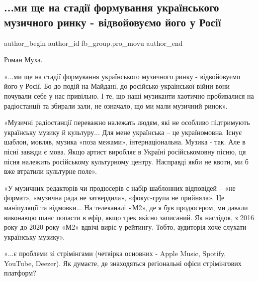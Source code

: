  
 
 
 
 
 
\subsection{...ми ще на стадії формування українського музичного ринку - відвойовуємо його у Росії}
\label{sec:18_06_2021.fb.fb_group.pro_movu.1.muzyka_rynok_rossia}
\ifcmt
 author_begin
   author_id fb_group.pro_movu
 author_end
\fi

Роман Муха.

«...ми ще на стадії формування українського музичного ринку - відвойовуємо його
у Росії. Бо до подій на Майдані, до російсько-української війни вони почували
себе у нас привільно. І те, що наші музиканти хаотично пробивалися на
радіостанції та збирали зали, не означало, що ми мали музичний ринок». 

«Музичні радіостанції переважно належать людям, які не особливо підтримують
українську музику й культуру... Для мене українська – це україномовна. Існує
шаблон, мовляв, музика «поза межами», інтернаціональна. Музика - так. Але в
пісні завжди є мова. Якщо артист виробляє в Україні російськомовну пісню, ця
пісня належить російському культурному центру. Насправді якби не квоти, ми б
вже втратили культурне поле».

«У  музичних редакторів чи продюсерів є набір шаблонних відповідей – «не
формат», «музична рада не затвердила», «фокус-група не прийняла». Це
маніпуляції та відмовки... На телеканалі «М2», де я був продюсером, ми давали
виконавцю шанс попасти в ефір, якщо трек якісно записаний. Як наслідок, з 2016
року до 2020 року «М2» вдвічі виріс у рейтингу. Тобто, аудиторія хоче слухати
українську музику».

«...є проблеми зі стрімінгами (четвірка основних - Apple Music, Spotify,
YouTube, Deezer). Як думаєте, де знаходяться регіональні офіси стрімінгових
платформ?

